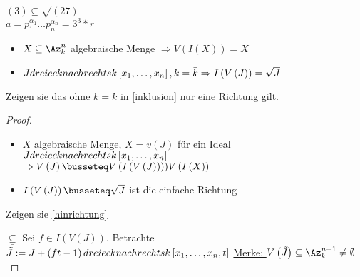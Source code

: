 \begin{bem}
\begin{bsp}
\begin{prop}
\begin{itemize}
\begin{bsp}
\begin{bem}
\begin{bsp}
\begin{bsp}
\( \left( 3 \right)\subseteq \sqrt{ \left( 27 \right) }   \) \\
\( a=p_1^{\alpha_1} \dots p_n^{\alpha_n} =3^3*r\) \\
\begin{prop}
\begin{itemize}
\item \( X \subseteq \Az_k^n \) algebraische Menge \( \Rightarrow V \left( I \left( X \right) \right) = X \) 
\item \label{inklusion}\(J dreieck nach rechts k \left[x_1, \dots, x_n \right], k = \bar{k} \Rightarrow I \left( V \left( J \right) \right) = \sqrt{J} \)
\end{itemize}
\end{prop}
\begin{hausaufgabe}
Zeigen sie das  ohne \( k = \bar{k} \) in \ref{inklusion} nur eine Richtung gilt.
\end{hausaufgabe}
\begin{proof}
\begin{itemize}
\item \( X \) algebraische Menge, \dh \( X = v \left( J \right) \) f\"ur ein Ideal \( J dreieck nach rechts k \left[ x_1, \dots, x_n \right] \)\\
\( \Rightarrow V \left( J \right) \busseteq V \left( I \left( V \left( J \right) \right) \right) ) V \left( I \left( X \right) \right) \)
\item \( I \left( V \left( J \right) \right) \busseteq \sqrt{J } \) ist die einfache Richtung \label{hinrichtung}
\end{itemize}
\begin{hausaufgabe}
Zeigen sie \ref{hinrichtung}
\end{hausaufgabe}
\( \underline{ \subseteq } \) Sei \( f \in I \left( V \left( J \right) \right) \).
Betrachte \( \tilde{J}:=J+\left( f t -1 \right) dreieck nach rechts k\left[x_1,\dots, x_n,t \right]  \) 
\underline{Merke: } \( V \left( \tilde{J } \right) \subseteq \Az_k^{n+1} \neq \emptyset \) \\

\end{proof}
\end{bsp}
\end{bsp}
\end{bem}
\end{bsp}
\end{itemize}
\end{prop}
\end{bsp}
\end{bem}
